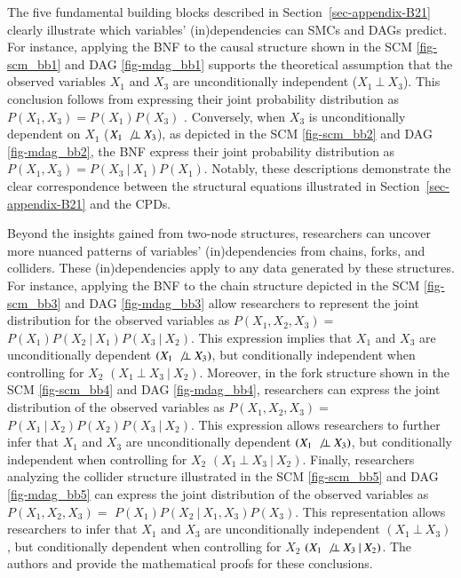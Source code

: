 \documentclass[
  authoryear,
  review,
  1p]{elsarticle}
\begin{document}
The five fundamental building blocks described in
Section~\ref{sec-appendix-B21} clearly illustrate which variables'
(in)dependencies can SMCs and DAGs predict. For instance, applying the
BNF to the causal structure shown in the SCM \ref{fig-scm_bb1} and DAG
\ref{fig-mdag_bb1} supports the theoretical assumption that the observed
variables \(X_{1}\) and \(X_{3}\) are unconditionally independent
(\(X_{1} \:\bot\:X_{3}\)). This conclusion follows from expressing their
joint probability distribution as
\(P(X_{1}, X_{3}) = P(X_{1}) P(X_{3})\) \citep[pp.~24]{Neal_2020}.
Conversely, when \(X_{3}\) is unconditionally dependent on \(X_{1}\)
(\(X_{1} \:\not\bot\:X_{3}\)), as depicted in the SCM \ref{fig-scm_bb2}
and DAG \ref{fig-mdag_bb2}, the BNF express their joint probability
distribution as \(P(X_{1}, X_{3}) = P(X_{3} \:|\:X_{1}) P(X_{1})\).
Notably, these descriptions demonstrate the clear correspondence between
the structural equations illustrated in Section~\ref{sec-appendix-B21}
and the CPDs.

Beyond the insights gained from two-node structures, researchers can
uncover more nuanced patterns of variables' (in)dependencies from
chains, forks, and colliders. These (in)dependencies apply to any data
generated by these structures. For instance, applying the BNF to the
chain structure depicted in the SCM \ref{fig-scm_bb3} and DAG
\ref{fig-mdag_bb3} allow researchers to represent the joint distribution
for the observed variables as \(P(X_{1},X_{2},X_{3}) =\)
\(P(X_{1}) P(X_{2} \:|\:X_{1}) P(X_{3} \:|\:X_{2})\). This expression
implies that \(X_{1}\) and \(X_{3}\) are unconditionally dependent
\((X_{1} \:\not\bot\:X_{3})\), but conditionally independent when
controlling for \(X_{2}\) \((X_{1} \:\bot\:X_{3} \:|\:X_{2})\).
Moreover, in the fork structure shown in the SCM \ref{fig-scm_bb4} and
DAG \ref{fig-mdag_bb4}, researchers can express the joint distribution
of the observed variables as \(P(X_{1},X_{2},X_{3}) =\)
\(P(X_{1} \:|\:X_{2}) P(X_{2}) P(X_{3} \:|\:X_{2})\). This expression
allows researchers to further infer that \(X_{1}\) and \(X_{3}\) are
unconditionally dependent \((X_{1} \:\not\bot\:X_{3})\), but
conditionally independent when controlling for \(X_{2}\)
\((X_{1} \:\bot\:X_{3} \:|\:X_{2})\). Finally, researchers analyzing the
collider structure illustrated in the SCM \ref{fig-scm_bb5} and DAG
\ref{fig-mdag_bb5} can express the joint distribution of the observed
variables as \(P(X_{1},X_{2},X_{3}) =\)
\(P(X_{1}) P(X_{2} \:|\:X_{1}, X_{3}) P(X_{3})\). This representation
allows researchers to infer that \(X_{1}\) and \(X_{3}\) are
unconditionally independent \((X_{1} \:\bot\:X_{3})\), but conditionally
dependent when controlling for \(X_{2}\)
\((X_{1} \:\not\bot\:X_{3} \:|\:X_{2})\). The authors \citet[pp.~37, 40,
41]{Pearl_et_al_2016} and \citet[pp.~25--26]{Neal_2020} provide the
mathematical proofs for these conclusions.
\end{document}
